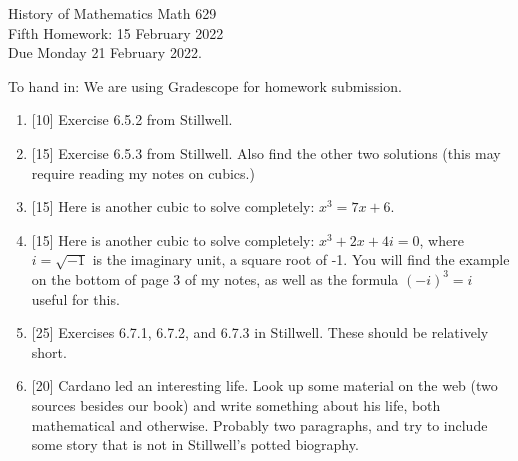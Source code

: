 \documentclass[12pt]{article}
\begin{document}
\LARGE 
\noindent
{\color{Maroon}History of Mathematics \hfill Math 629}\vspace{2pt}\\
\large
Fifth Homework: \hfill 15 February 2022\\
Due Monday 21 February 2022.
\normalsize\vspace{10pt}

To hand in: We are using Gradescope for homework submission.


\begin{enumerate}

\item  {[10]}
     Exercise 6.5.2 from Stillwell.

   \item  {[15]}
     Exercise  6.5.3 from Stillwell.
    Also find the other two solutions (this may require reading my notes on cubics.)

  \item  {[15]}
    Here is another cubic to solve completely: $x^3=7x+6$.

    
  \item  {[15]}
    Here is another cubic to solve completely: $x^3+2x+4i=0$, where $i=\sqrt{-1}$ is the imaginary unit, a square root
    of -1.
    You will find the example on the bottom of page 3 of my notes, as well as the formula $(-i)^3=i$ useful for this.

  \item  {[25]}
    Exercises 6.7.1, 6.7.2, and 6.7.3 in Stillwell. These should be relatively short.

  \item  {[20]}
    Cardano led an interesting life.
    Look up some material on the web (two sources besides our book) and write something about his life, both mathematical
    and otherwise.
    Probably two paragraphs, and try to include some story that is not in Stillwell's potted biography. 
\end{enumerate}
\end{document}
